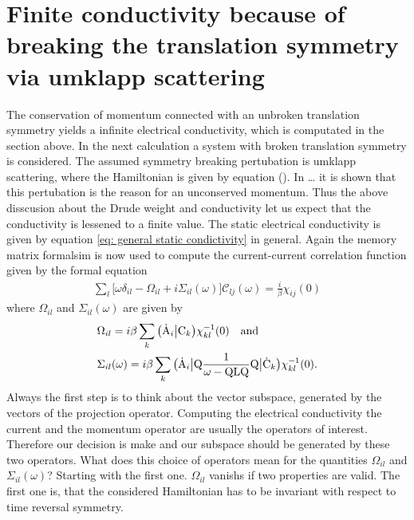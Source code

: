 \section{Finite conductivity because of breaking the translation symmetry via umklapp scattering}
\label{sec: finite conductivity because of breaking the translation symmetry via umklapp scattering}
%
%
The conservation of momentum connected with an unbroken translation symmetry yields a infinite electrical conductivity, which is computated in the section above.
In the next calculation a system with broken translation symmetry is considered.
The assumed symmetry breaking pertubation is umklapp scattering, where the Hamiltonian is given by equation ().
In \dots{} it is shown that this pertubation is the reason for an unconserved momentum.
Thus the above disscusion about the Drude weight and conductivity let us expect that the conductivity is lessened to a finite value.
The static electrical conductivity is given by equation \eqref{eq: general static condictivity} in general.
Again the memory matrix formalsim is now used to compute the current-current correlation function given by the formal equation
%
\begin{align}
	\sum\limits_{l} \Big[\omega \delta_{il} - \Omega_{il} + i \Sigma_{il}(\omega)\Big] \mathcal{C}_{lj}(\omega) = \frac{i}{\beta} \chi_{ij}(0)
\end{align}
%
where $\Omega_{il}$ and $\Sigma_{il}(\omega)$ are given by
%
\begin{align}
	&\Omega_{il} = i \beta \sum\limits_{k} \obraket{\dot{\mt{A}}_{i}}{\mt{C}_{k}} \chi_{kl}^{-1}(0) \qq{and} \\
	&\Sigma_{il}(\omega) = i \beta \sum\limits_{k} \obra{\dot{\mt{A}}_{i}} \mt{Q} \frac{1}{\omega - \mt{QLQ}} \mt{Q} \oket{\dot{\mt{C}}_{k}} \chi_{kl}^{-1}(0).
\end{align}
%
Always the first step is to think about the vector subspace, generated by the vectors of the projection operator.
Computing the electrical conductivity the current and the momentum operator are usually the operators of interest. 
Therefore our decision is make and our subspace should be generated by these two operators.
What does this choice of operators mean for the quantities $\Omega_{il}$ and $\Sigma_{il}(\omega)$?
Starting with the first one.
$\Omega_{il}$ vanishs if two properties are valid.
The first one is, that the considered Hamiltonian has to be invariant with respect to time reversal symmetry.
